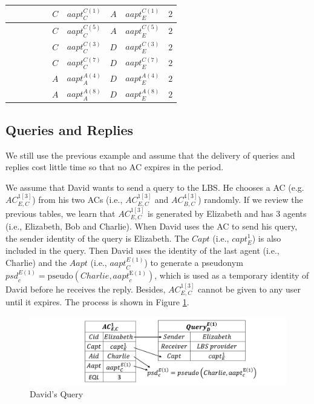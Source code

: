 \begin{table} [H]
\begin{tabu}{|c|c|c|c|c|c|c|c|c|c|}
 &  &  &  &  & $C$ & ${aapt}_{C}^{C\left(1\right)}$ & $A$ & ${aapt}_{E}^{C\left(1\right)}$ & $2$ \\ \hline
 &  &  &  &  & $C$ & ${aapt}_{C}^{C\left(5\right)}$ & $A$ & ${aapt}_{E}^{C\left(5\right)}$ & $2$ \\ \hline
 &  &  &  &  & $C$ & ${aapt}_{C}^{C\left(3\right)}$ & $D$ & ${aapt}_{E}^{C\left(3\right)}$ & $2$ \\ \hline
 &  &  &  &  & $C$ & ${aapt}_{C}^{C\left(7\right)}$ & $D$ & ${aapt}_{E}^{C\left(7\right)}$ & $2$ \\ \hline
 &  &  &  &  & $A$ & ${aapt}_{A}^{A\left(4\right)}$ & $D$ & ${aapt}_{E}^{A\left(4\right)}$ & $2$ \\ \hline
 &  &  &  &  & $A$ & ${aapt}_{A}^{A\left(8\right)}$ & $D$ & ${aapt}_{E}^{A\left(8\right)}$ & $2$ \\ \hline
\end{tabu}
\end{table}


\subsection{ Queries and Replies}

\noindent We still use the previous example and assume that the delivery of queries and replies cost little time so that no AC expires in the period.

We assume that David wants to send a query to the LBS. He chooses a AC (e.g. ${AC}^{1\left[3\right]}_{E,C}$) from his two ACs (i.e., ${AC}^{1\left[3\right]}_{E,C}$ and ${AC}^{4\left[3\right]}_{B,C}$) randomly. If we review the previous tables, we learn that ${AC}^{1\left[3\right]}_{E,C}$ is generated by Elizabeth and has 3 agents (i.e., Elizabeth, Bob and Charlie). When David uses the AC to send his query, the sender identity of the query is Elizabeth. The $Capt$ (i.e., ${capt}^1_E$) is also included in the query. Then David uses the identity of the last agent (i.e., Charlie) and the $Aapt$ (i.e., ${aapt}^{E\left(1\right)}_C$) to generate a pseudonym ${psd}^{E\left(1\right)}_c=\mathrm{pseudo}\left(Charlie,{aapt}^{\mathrm{E}\left(1\right)}_c\right)$, which is used as a temporary identity of David before he receives the reply. Besides, ${AC}^{1\left[3\right]}_{E,C}$ cannot be given to any user until it expires. The process is shown in Figure \ref{fig:DavidsQuery}.

\begin{figure} [H]
  \centering 
  \includegraphics[width=6.0in]{figures/FIG_4_10_Davids_Query.png}
  \caption{David's Query} 
  \label{fig:DavidsQuery} %
\end{figure}

